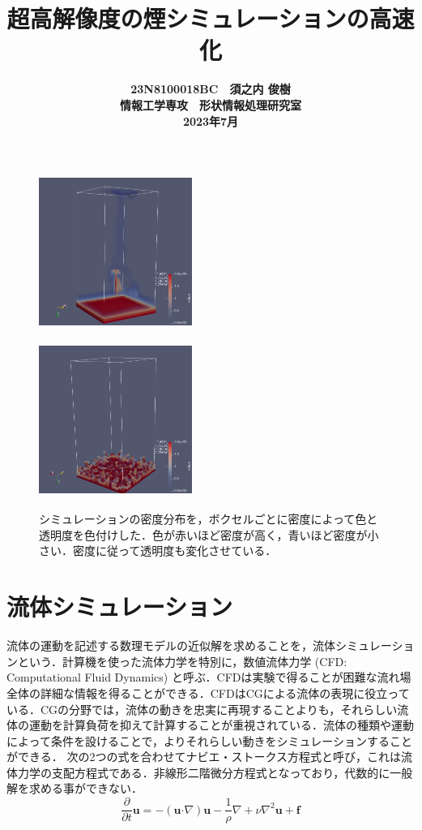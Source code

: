 \documentclass[10pt,a4paper,notitlepage,oneside,twocolumn]{abst_jsarticle}
\title{
{\bf 超高解像度の煙シミュレーションの高速化}
}
\author{\begin{center}
{\large {\bf 23N8100018BC　須之内 俊樹}}\\
{\large {\bf 情報工学専攻　形状情報処理研究室}}\\
{\large {\bf 2023年7月}}
\end{center}}
\date{}
\begin{document}
\maketitle
\begin{figure}[h]
\begin{minipage}[t]{0.5\linewidth}
  \centering
  \includegraphics[height=5cm,width=5cm]{fd_conf_73.png}
  \label{fig:fig1}
  \end{minipage}
  \begin{minipage}[t]{0.5\linewidth}
  \centering
  \includegraphics[height=5cm,width=5cm]{cd_smoke.png}
  \label{fig:fig2}
  \end{minipage}
\caption{シミュレーションの密度分布を，ボクセルごとに密度によって色と透明度を色付けした．色が赤いほど密度が高く，青いほど密度が小さい．密度に従って透明度も変化させている．}
\label{fig}
\end{figure}
\section{流体シミュレーション} \label{sec:intro}
流体の運動を記述する数理モデルの近似解を求めることを，流体シミュレーションという．計算機を使った流体力学を特別に，数値流体力学 (CFD: Computational Fluid Dynamics) と呼ぶ．CFDは実験で得ることが困難な流れ場全体の詳細な情報を得ることができる．CFDはCGによる流体の表現に役立っている．CGの分野では，流体の動きを忠実に再現することよりも，それらしい流体の運動を計算負荷を抑えて計算することが重視されている．流体の種類や運動によって条件を設けることで，よりそれらしい動きをシミュレーションすることができる．
次の2つの式を合わせてナビエ・ストークス方程式と呼び，これは流体力学の支配方程式である．非線形二階微分方程式となっており，代数的に一般解を求める事ができない．
$$\frac{\partial}{\partial t}\bm{u} = - (\bm{u} \boldsymbol{\cdot}\nabla) \bm{u} - \frac{1}{\rho}\nabla + \nu\nabla^2\bm{u} + \bm{f}$$
\end{document}
